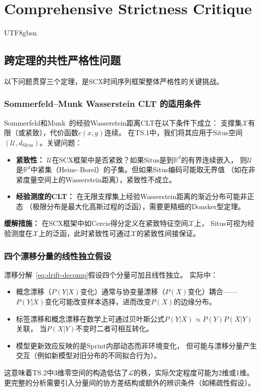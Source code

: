 \documentclass[12pt,a4paper]{article}
\newcommand{\R}{\mathbb{R}}
\newcommand{\cX}{\mathcal{X}}
\newcommand{\cU}{\mathcal{U}}
\newcommand{\Situs}{\mathrm{Situs}}
\newcommand{\Sprint}{\mathrm{Sprint}}
\begin{document}
\section{Comprehensive Strictness Critique}
\begin{CJK}{UTF8}{gbsn}

\subsection{跨定理的共性严格性问题}

以下问题贯穿三个定理，是SCX时间序列框架整体严格性的关键挑战。

\subsubsection{Sommerfeld--Munk Wasserstein CLT 的适用条件}
Sommerfeld和Munk~\citep{sommerfeld2018inference}的经验Wasserstein距离CLT在以下条件下成立：
支撑集$\mathcal{X}$有限（或紧致），代价函数$c(x,y)$连续。
在TS.1中，我们将其应用于Situs空间$(\cU, d_{\Situs})$。关键问题：
\begin{itemize}
\item \textbf{紧致性：} $\cU$在SCX框架中是否紧致？如果$\Situs$是到$\R^d$的有界连续嵌入，
则$\cU$是$\R^d$中紧集（Heine--Borel）的子集。但如果Situs编码可能取无界值
（如在非紧度量空间上的Wasserstein距离），紧致性不成立。
\item \textbf{经验测度的CLT：} 在无限支撑集上经验Wasserstein距离的渐近分布可能非正态
（极限分布是最大化高斯过程的泛函），需要更精细的Donsker型定理。
\end{itemize}
\textbf{缓解措施：} 在SCX框架中如Cercis得分定义在紧致特征空间$\cX$上，
Situs可视为经验测度在$\cX$上的泛函，此时紧致性可通过$\cX$的紧致性间接保证。

\subsubsection{四个漂移分量的线性独立假设}
漂移分解~\eqref{eq:drift-decomp}假设四个分量可加且线性独立。
实际中：
\begin{itemize}
\item 概念漂移（$P(Y|X)$变化）通常与协变量漂移（$P(X)$变化）耦合——
  $P(Y|X)$变化可能改变样本选择，进而改变$P(X)$的边缘分布。
\item 标签漂移和概念漂移在数学上可通过贝叶斯公式$P(Y|X) \propto P(Y)P(X|Y)$关联，
  当$P(X|Y)$不变时二者可相互转化。
\item 模型更新效应反映的是$\Sprint$内部动态而非环境变化，
  但可能与漂移分量产生交互（例如新模型对旧分布的不同拟合行为）。
\end{itemize}
这意味着TS.2中3维零空间的构造低估了$\mathcal{L}$的秩，实际欠定程度可能为2维或1维。
更完整的分析需要引入分量间的协方差结构或额外的辨识条件（如稀疏性假设）。


\end{CJK}
\end{document}

